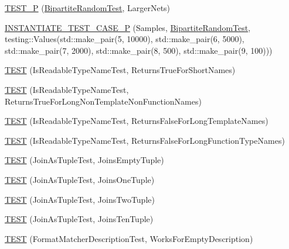 \begin{DoxyCompactItemize}
\item 
\hyperlink{namespacetesting_1_1gmock__matchers__test_ace6351a5a34b746491458140b06534ed}{T\+E\+S\+T\+\_\+P} (\hyperlink{classtesting_1_1gmock__matchers__test_1_1BipartiteRandomTest}{Bipartite\+Random\+Test}, Larger\+Nets)
\item 
\hyperlink{namespacetesting_1_1gmock__matchers__test_a857f48ffb1fc6f5ce61aec79b5c94da8}{I\+N\+S\+T\+A\+N\+T\+I\+A\+T\+E\+\_\+\+T\+E\+S\+T\+\_\+\+C\+A\+S\+E\+\_\+P} (Samples, \hyperlink{classtesting_1_1gmock__matchers__test_1_1BipartiteRandomTest}{Bipartite\+Random\+Test}, testing\+::\+Values(std\+::make\+\_\+pair(5, 10000), std\+::make\+\_\+pair(6, 5000), std\+::make\+\_\+pair(7, 2000), std\+::make\+\_\+pair(8, 500), std\+::make\+\_\+pair(9, 100)))
\item 
\hyperlink{namespacetesting_1_1gmock__matchers__test_aef0bf5f855b1e75c63ec45408b5a23ba}{T\+E\+ST} (Is\+Readable\+Type\+Name\+Test, Returns\+True\+For\+Short\+Names)
\item 
\hyperlink{namespacetesting_1_1gmock__matchers__test_a839515535e3e75d4f80ba6ae8f7347ec}{T\+E\+ST} (Is\+Readable\+Type\+Name\+Test, Returns\+True\+For\+Long\+Non\+Template\+Non\+Function\+Names)
\item 
\hyperlink{namespacetesting_1_1gmock__matchers__test_ad1630d47de9f4fcdc00ab4962eaeea05}{T\+E\+ST} (Is\+Readable\+Type\+Name\+Test, Returns\+False\+For\+Long\+Template\+Names)
\item 
\hyperlink{namespacetesting_1_1gmock__matchers__test_a30516b1c70e14132d1d87ab08b96aa2f}{T\+E\+ST} (Is\+Readable\+Type\+Name\+Test, Returns\+False\+For\+Long\+Function\+Type\+Names)
\item 
\hyperlink{namespacetesting_1_1gmock__matchers__test_aa633c0b7e0f0316c23bff10e9963f773}{T\+E\+ST} (Join\+As\+Tuple\+Test, Joins\+Empty\+Tuple)
\item 
\hyperlink{namespacetesting_1_1gmock__matchers__test_acaec7fcf41bb1cdf7124b443e7ab28e8}{T\+E\+ST} (Join\+As\+Tuple\+Test, Joins\+One\+Tuple)
\item 
\hyperlink{namespacetesting_1_1gmock__matchers__test_a0831a9160c5420fcd363e4a520f0fb61}{T\+E\+ST} (Join\+As\+Tuple\+Test, Joins\+Two\+Tuple)
\item 
\hyperlink{namespacetesting_1_1gmock__matchers__test_a56811b12ff298040a3d44dba0a2e4a8e}{T\+E\+ST} (Join\+As\+Tuple\+Test, Joins\+Ten\+Tuple)
\item 
\hyperlink{namespacetesting_1_1gmock__matchers__test_ae104f652fab7d1b3c3873f6987401481}{T\+E\+ST} (Format\+Matcher\+Description\+Test, Works\+For\+Empty\+Description)

\end{DoxyCompactItemize}
